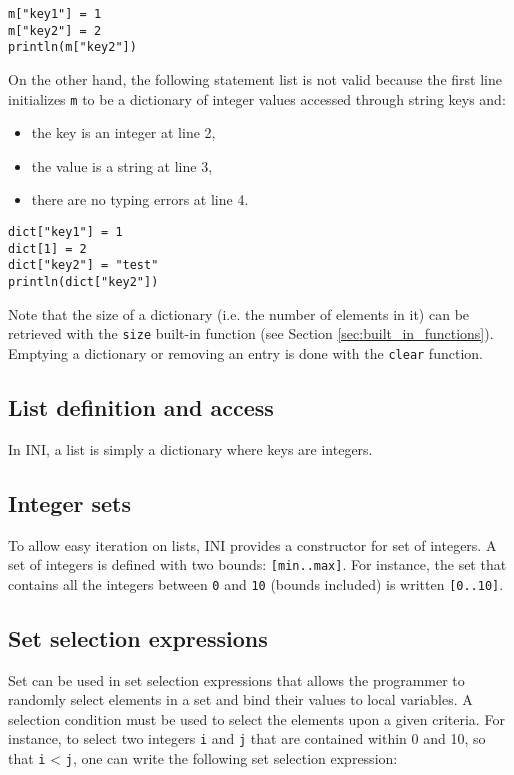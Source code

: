 \documentclass[11pt]{report}
\begin{document}
\begin{lstlisting}[numbers=none]
m["key1"] = 1
m["key2"] = 2
println(m["key2"])
\end{lstlisting}

On the other hand, the following statement list is not valid because the first line initializes \texttt{m} to be a dictionary of integer values accessed through string keys and:

\begin{itemize}
\item the key is an integer at line 2,
\item the value is a string at line 3,
\item there are no typing errors at line 4.
\end{itemize}

\begin{lstlisting}
dict["key1"] = 1
dict[1] = 2
dict["key2"] = "test"
println(dict["key2"])
\end{lstlisting}

Note that the size of a dictionary (i.e. the number of elements in it) can be retrieved with the \texttt{size} built-in function (see Section \ref{sec:built_in_functions}).  Emptying a dictionary or removing an entry is done with the \texttt{clear} function.

\subsection{List definition and access}

In INI, a list is simply a dictionary where keys are integers.

\subsection{Integer sets}

To allow easy iteration on lists, INI provides a constructor for set of integers. A set of integers is defined with two bounds: \texttt{[min..max]}. For instance, the set that contains all the integers between \texttt{0} and \texttt{10} (bounds included) is written \texttt{[0..10]}.

\subsection{Set selection expressions\label{subsubsec:setselectionexpressions}}

Set can be used in set selection expressions that allows the programmer to randomly select elements in a set and bind their values to local variables. A selection condition must be used to select the elements upon a given criteria. For instance, to select two integers \texttt{i} and \texttt{j} that are contained within 0 and 10, so that \texttt{i} < \texttt{j}, one can write the following set selection expression:
\end{document}
